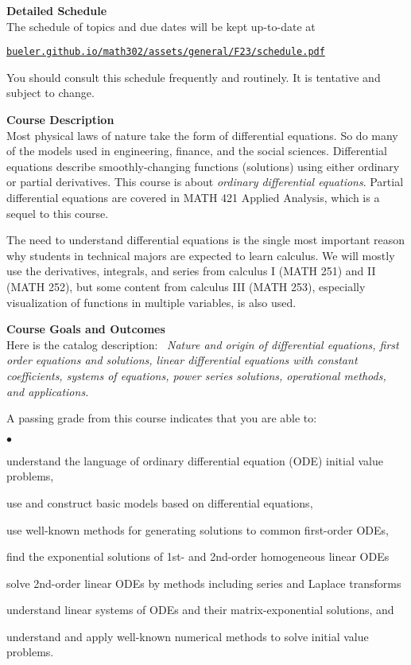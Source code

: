 \documentclass[12pt]{article}
\renewcommand{\emph}[1]{\textsf{\textbf{#1}}}
\newcommand{\localhead}[1]{\par\smallskip\textbf{#1}\nobreak\\}%
\def\heading#1{\localhead{\large\emph{#1}}}
\newenvironment{clist}%
{\bgroup\parskip 0pt\begin{list}{$\bullet$}{\partopsep 4pt\topsep 0pt\itemsep -2pt}}%
{\end{list}\egroup}%
\begin{document}
\medskip

\cfoot{\thepage}

\heading{Detailed Schedule}
The schedule of topics and due dates will be kept up-to-date at

\smallskip
\centerline{\href{https://bueler.github.io/math302/assets/general/F23/schedule.pdf}{\tt bueler.github.io/math302/assets/general/F23/schedule.pdf}}

You should consult this schedule frequently and routinely.  It is tentative and subject to change.


\medskip
\heading{Course Description}
Most physical laws of nature take the form of differential equations.  So do many of the models used in engineering, finance, and the social sciences.  Differential equations describe smoothly-changing functions (solutions) using either ordinary or partial derivatives.  This course is about \textsl{ordinary differential equations}.  Partial differential equations are covered in MATH 421 Applied Analysis, which is a sequel to this course.

The need to understand differential equations is the single most important reason why students in technical majors are expected to learn calculus.  We will mostly use the derivatives, integrals, and series from calculus I (MATH 251) and II (MATH 252), but some content from calculus III (MATH 253), especially visualization of functions in multiple variables, is also used.


\bigskip\bigskip
\clearpage\newpage
\heading{Course Goals and Outcomes}
Here is the catalog description: \, \textsl{Nature and origin of differential equations, first order equations and solutions, linear differential equations with constant coefficients, systems of equations, power series solutions, operational methods, and applications.}

A passing grade from this course indicates that you are able to:

\begin{clist}
\item understand the language of ordinary differential equation (ODE) initial value problems,
\item use and construct basic models based on differential equations,
\item use well-known methods for generating solutions to common first-order ODEs,
\item find the exponential solutions of 1st- and 2nd-order homogeneous linear ODEs
\item solve 2nd-order linear ODEs by methods including series and Laplace transforms
\item understand linear systems of ODEs and their matrix-exponential solutions, and
\item understand and apply well-known numerical methods to solve initial value problems.
\end{clist}
\end{document}
